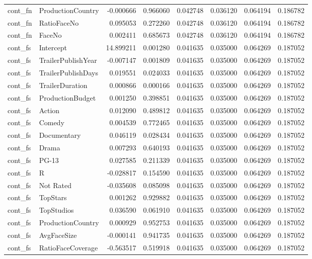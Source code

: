 \begin{tabular}{llrrrrrr}
cont_fn & ProductionCountry & -0.000666 & 0.966060 & 0.042748 & 0.036120 & 0.064194 & 0.186782 \\
cont_fn & RatioFaceNo & 0.095053 & 0.272260 & 0.042748 & 0.036120 & 0.064194 & 0.186782 \\
cont_fn & FaceNo & 0.002411 & 0.685673 & 0.042748 & 0.036120 & 0.064194 & 0.186782 \\
cont_fs & Intercept & 14.899211 & 0.001280 & 0.041635 & 0.035000 & 0.064269 & 0.187052 \\
cont_fs & TrailerPublishYear & -0.007147 & 0.001809 & 0.041635 & 0.035000 & 0.064269 & 0.187052 \\
cont_fs & TrailerPublishDays & 0.019551 & 0.024033 & 0.041635 & 0.035000 & 0.064269 & 0.187052 \\
cont_fs & TrailerDuration & 0.000866 & 0.000166 & 0.041635 & 0.035000 & 0.064269 & 0.187052 \\
cont_fs & ProductionBudget & 0.001250 & 0.398851 & 0.041635 & 0.035000 & 0.064269 & 0.187052 \\
cont_fs & Action & 0.012090 & 0.489812 & 0.041635 & 0.035000 & 0.064269 & 0.187052 \\
cont_fs & Comedy & 0.004539 & 0.772465 & 0.041635 & 0.035000 & 0.064269 & 0.187052 \\
cont_fs & Documentary & 0.046119 & 0.028434 & 0.041635 & 0.035000 & 0.064269 & 0.187052 \\
cont_fs & Drama & 0.007293 & 0.640193 & 0.041635 & 0.035000 & 0.064269 & 0.187052 \\
cont_fs & PG-13 & 0.027585 & 0.211339 & 0.041635 & 0.035000 & 0.064269 & 0.187052 \\
cont_fs & R & -0.028817 & 0.154590 & 0.041635 & 0.035000 & 0.064269 & 0.187052 \\
cont_fs & Not Rated & -0.035608 & 0.085098 & 0.041635 & 0.035000 & 0.064269 & 0.187052 \\
cont_fs & TopStars & 0.001262 & 0.929882 & 0.041635 & 0.035000 & 0.064269 & 0.187052 \\
cont_fs & TopStudios & 0.036590 & 0.061910 & 0.041635 & 0.035000 & 0.064269 & 0.187052 \\
cont_fs & ProductionCountry & 0.000929 & 0.952753 & 0.041635 & 0.035000 & 0.064269 & 0.187052 \\
cont_fs & AvgFaceSize & -0.000141 & 0.941735 & 0.041635 & 0.035000 & 0.064269 & 0.187052 \\
cont_fs & RatioFaceCoverage & -0.563517 & 0.519918 & 0.041635 & 0.035000 & 0.064269 & 0.187052 \\

\end{tabular}
